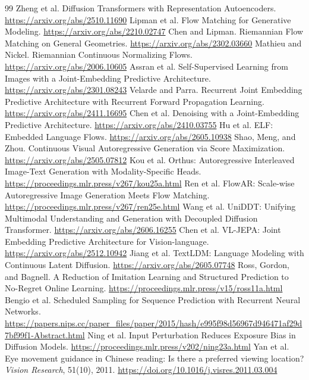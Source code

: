 \documentclass[11pt]{article}
\begin{document}
\begin{thebibliography}{99}
 Zheng et al. Diffusion Transformers with Representation Autoencoders. \url{https://arxiv.org/abs/2510.11690}
 Lipman et al. Flow Matching for Generative Modeling. \url{https://arxiv.org/abs/2210.02747}
 Chen and Lipman. Riemannian Flow Matching on General Geometries. \url{https://arxiv.org/abs/2302.03660}
 Mathieu and Nickel. Riemannian Continuous Normalizing Flows. \url{https://arxiv.org/abs/2006.10605}
 Assran et al. Self-Supervised Learning from Images with a Joint-Embedding Predictive Architecture. \url{https://arxiv.org/abs/2301.08243}
 Velarde and Parra. Recurrent Joint Embedding Predictive Architecture with Recurrent Forward Propagation Learning. \url{https://arxiv.org/abs/2411.16695}
 Chen et al. Denoising with a Joint-Embedding Predictive Architecture. \url{https://arxiv.org/abs/2410.03755}
 Hu et al. ELF: Embedded Language Flows. \url{https://arxiv.org/abs/2605.10938}
 Shao, Meng, and Zhou. Continuous Visual Autoregressive Generation via Score Maximization. \url{https://arxiv.org/abs/2505.07812}
 Kou et al. Orthus: Autoregressive Interleaved Image-Text Generation with Modality-Specific Heads. \url{https://proceedings.mlr.press/v267/kou25a.html}
 Ren et al. FlowAR: Scale-wise Autoregressive Image Generation Meets Flow Matching. \url{https://proceedings.mlr.press/v267/ren25e.html}
 Wang et al. UniDDT: Unifying Multimodal Understanding and Generation with Decoupled Diffusion Transformer. \url{https://arxiv.org/abs/2606.16255}
 Chen et al. VL-JEPA: Joint Embedding Predictive Architecture for Vision-language. \url{https://arxiv.org/abs/2512.10942}
 Jiang et al. TextLDM: Language Modeling with Continuous Latent Diffusion. \url{https://arxiv.org/abs/2605.07748}
 Ross, Gordon, and Bagnell. A Reduction of Imitation Learning and Structured Prediction to No-Regret Online Learning. \url{https://proceedings.mlr.press/v15/ross11a.html}
 Bengio et al. Scheduled Sampling for Sequence Prediction with Recurrent Neural Networks. \url{https://papers.nips.cc/paper_files/paper/2015/hash/e995f98d56967d946471af29d7bf99f1-Abstract.html}
 Ning et al. Input Perturbation Reduces Exposure Bias in Diffusion Models. \url{https://proceedings.mlr.press/v202/ning23a.html}
 Yan et al. Eye movement guidance in Chinese reading: Is there a preferred viewing location? \emph{Vision Research}, 51(10), 2011. \url{https://doi.org/10.1016/j.visres.2011.03.004}
\end{thebibliography}
\end{document}
